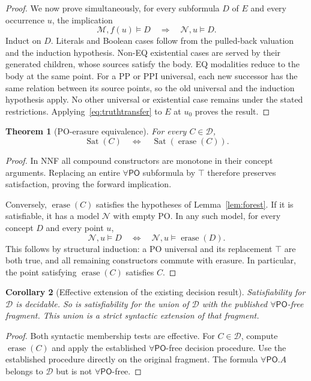 \documentclass[11pt,letterpaper]{article}
\newcommand{\PO}{\mathsf{PO}}
\newcommand{\Sat}{\operatorname{Sat}}
\newcommand{\er}{\operatorname{erase}}
\newtheorem{theorem}{Theorem}[section]
\newtheorem{corollary}[theorem]{Corollary}
\theoremstyle{definition}
\theoremstyle{remark}
\begin{document}
\begin{proof}
We now prove simultaneously, for every subformula $D$ of $E$ and every
occurrence $u$, the implication
\begin{equation}
\mathcal M,f(u)\models D\quad\Longrightarrow\quad
\mathcal N,u\models D.
\label{eq:truthtransfer}
\end{equation}
Induct on $D$. Literals and Boolean cases follow from the pulled-back
valuation and the induction hypothesis. Non-EQ existential cases are
served by their generated children, whose sources satisfy the body.
EQ modalities reduce to the body at the same point. For a PP or PPI
universal, each new successor has the same relation between its source
points, so the old universal and the induction hypothesis apply. No other
universal or existential case remains under the stated restrictions.
Applying~\eqref{eq:truthtransfer} to $E$ at $u_0$ proves the result.
\end{proof}

\begin{theorem}[PO-erasure equivalence]
\label{thm:erasure}
For every $C\in\mathcal D$,
\[
\Sat(C)\quad\Longleftrightarrow\quad\Sat(\er(C)).
\]
\end{theorem}
\begin{proof}
In NNF all compound constructors are monotone in their concept arguments.
Replacing an entire $\forall\PO$ subformula by $\top$ therefore
preserves satisfaction, proving the forward implication.

Conversely, $\er(C)$ satisfies the hypotheses of Lemma~\ref{lem:forest}.
If it is satisfiable, it has a model $\mathcal N$ with empty PO. In any
such model, for every concept $D$ and every point $u$,
\[
\mathcal N,u\models D\quad\Longleftrightarrow\quad
\mathcal N,u\models\er(D).
\]
This follows by structural induction: a PO universal and its replacement
$\top$ are both true, and all remaining constructors commute with
erasure. In particular, the point satisfying $\er(C)$ satisfies $C$.
\end{proof}

\begin{corollary}[Effective extension of the existing decision result]
\label{cor:decision}
Satisfiability for $\mathcal D$ is decidable. So is satisfiability for
the union of $\mathcal D$ with the published $\forall\PO$-free fragment.
This union is a strict syntactic extension of that fragment.
\end{corollary}
\begin{proof}
Both syntactic membership tests are effective. For $C\in\mathcal D$,
compute $\er(C)$ and apply the established $\forall\PO$-free decision
procedure. Use the established procedure directly on the original
fragment. The formula $\forall\PO.A$ belongs to $\mathcal D$ but is
not $\forall\PO$-free.
\end{proof}
\end{document}
